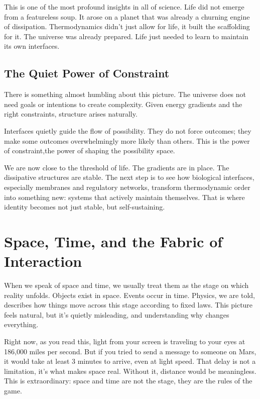 \documentclass[
  openright]{book}
\begin{document}
This is one of the most profound insights in all of science. Life did
not emerge from a featureless soup. It arose on a planet that was
already a churning engine of dissipation. Thermodynamics didn't just
allow for life, it built the scaffolding for it. The universe was
already prepared. Life just needed to learn to maintain its own
interfaces.

\section{The Quiet Power of
Constraint}\label{the-quiet-power-of-constraint}

There is something almost humbling about this picture. The universe does
not need goals or intentions to create complexity. Given energy
gradients and the right constraints, structure arises naturally.

Interfaces quietly guide the flow of possibility. They do not force
outcomes; they make some outcomes overwhelmingly more likely than
others. This is the power of constraint,the power of shaping the
possibility space.

We are now close to the threshold of life. The gradients are in place.
The dissipative structures are stable. The next step is to see how
biological interfaces, especially membranes and regulatory networks,
transform thermodynamic order into something new: systems that actively
maintain themselves. That is where identity becomes not just stable, but
self-sustaining.

\chapter{\texorpdfstring{Space, Time, and the
Fabric of
Interaction}{Space, Time, and the Fabric of Interaction}}\label{space-time-and-the-fabric-of-interaction}

When we speak of space and time, we usually treat them as the stage on
which reality unfolds. Objects exist in space. Events occur in time.
Physics, we are told, describes how things move across this stage
according to fixed laws. This picture feels natural, but it's quietly
misleading, and understanding why changes everything.

Right now, as you read this, light from your screen is traveling to your
eyes at 186,000 miles per second. But if you tried to send a message to
someone on Mars, it would take at least 3 minutes to arrive, even at
light speed. That delay is not a limitation, it's what makes space real.
Without it, distance would be meaningless. This is extraordinary: space
and time are not the stage, they are the rules of the game.
\end{document}
